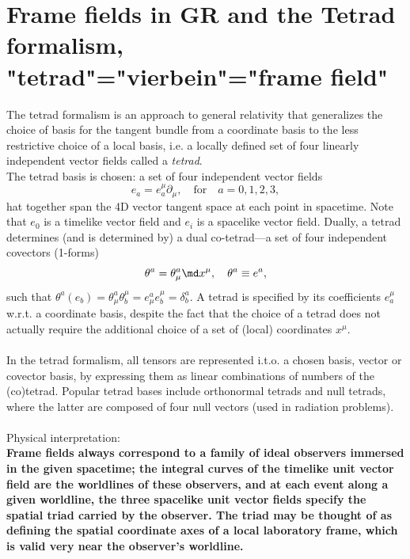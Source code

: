 \section{Frame fields in GR and the Tetrad formalism, "tetrad"="vierbein"="frame field"}
The tetrad formalism is an approach to general relativity that generalizes the choice of basis for the tangent bundle from a coordinate basis to the less restrictive choice of a local basis, i.e. a locally defined set of four linearly independent vector fields called a \emph{tetrad}.\\
The tetrad basis is chosen: a set of four independent vector fields
\begin{equation}
	e_a = e^{\mu}_a \partial_{\mu}, \quad \mathrm{for} \quad a=0,1,2,3,
\end{equation}
hat together span the 4D vector tangent space at each point in spacetime. Note that $e_0$ is a timelike vector field and $e_i$ is a spacelike vector field. Dually, a tetrad determines (and is determined by) a dual co-tetrad—a set of four independent covectors (1-forms)
\begin{equation}
	\theta^a = \theta^a_{\mu} \md x^{\mu}, \quad \theta^a \equiv e^a,
\end{equation}
such that $\theta^a(e_b) = \theta^a_{\mu} \theta^{\mu}_b=e^a_{\mu} e^{\mu}_b = \delta^a_b$.
A tetrad is specified by its coefficients $e^{\mu}_a$ w.r.t. a coordinate basis, despite the fact that the choice of a tetrad does not actually require the additional choice of a set of (local) coordinates $x^{\mu}$.\\
\\
In the tetrad formalism, all tensors are represented i.t.o. a chosen basis, vector or covector basis, by expressing them as linear combinations of numbers of the (co)tetrad. Popular tetrad bases include orthonormal tetrads and null tetrads, where the latter are composed of four null vectors (used in radiation problems).
\\
\\
Physical interpretation:\\
\textbf{Frame fields always correspond to a family of ideal observers immersed in the given spacetime; the integral curves of the timelike unit vector field are the worldlines of these observers, and at each event along a given worldline, the three spacelike unit vector fields specify the spatial triad carried by the observer. The triad may be thought of as defining the spatial coordinate axes of a local laboratory frame, which is valid very near the observer's worldline.}\\

